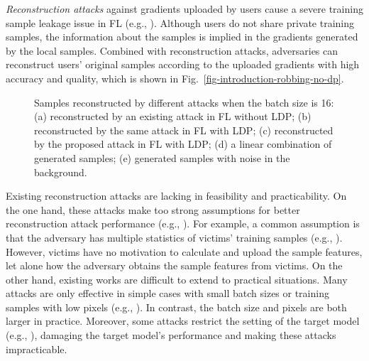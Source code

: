\documentclass[lettersize,journal]{IEEEtran}
\begin{document}
\textit{Reconstruction attacks} against gradients uploaded by users cause a severe training sample leakage issue in FL (e.g., \cite{Zhu2020DLG, Yang2023compress, Yin2021see, fowl2022robbing, Boenisch2021When, Wei2020Framework}). Although users do not share private training samples, the information about the samples is implied in the gradients generated by the local samples. Combined with reconstruction attacks, adversaries can reconstruct users' original samples according to the uploaded gradients with high accuracy and quality, which is shown in Fig.~\ref{fig-introduction-robbing-no-dp}.

\begin{figure}
\centering
{}\hspace{-0.14in}
\hspace{-0.14in}
    \hspace{-0.14in}
\hspace{-0.14in}
\caption{Samples reconstructed by different attacks when the batch size is 16: (a) reconstructed by an existing attack in FL without LDP; (b) reconstructed by the same attack in FL with LDP; (c) reconstructed by the proposed attack in FL with LDP; (d) a linear combination of generated samples;  (e) generated samples with noise in the background.}
\end{figure}

Existing reconstruction attacks are lacking in feasibility and practicability. On the one hand, these attacks make too strong assumptions for better reconstruction attack performance (e.g., \cite{Pasquini2022secure, yin2020dreaming, Boenisch2023Reconstructing}). For example, a common assumption is that the adversary has multiple statistics of victims' training samples (e.g., \cite{yin2020dreaming, jeon2021gradient, Hatamizadeh2022GradViT}). However, victims have no motivation to calculate and upload the sample features, let alone how the adversary obtains the sample features from victims. On the other hand, existing works are difficult to extend to practical situations. Many attacks are only effective in simple cases with small batch sizes or training samples with low pixels (e.g., \cite{Zhu2020DLG, Yang2023compress, Wei2020Framework, Song2020Analyzing}). In contrast, the batch size and pixels are both larger in practice. Moreover, some attacks restrict the setting of the target model (e.g., \cite{Song2020Analyzing, jin2021cafe, zhu2021rgap}), damaging the target model's performance and making these attacks impracticable.
\end{document}
